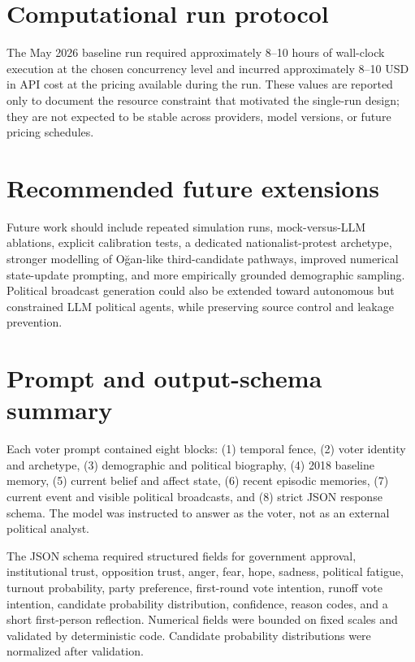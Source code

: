 \documentclass[pdflatex,sn-mathphys-num,iicol]{sn-jnl}
\begin{document}
\begin{appendices}
\section{Computational run protocol}\label{app:protocol}

The May 2026 baseline run required approximately 8--10 hours of wall-clock
execution at the chosen concurrency level and incurred approximately 8--10 USD
in API cost at the pricing available during the run. These values are reported
only to document the resource constraint that motivated the single-run design;
they are not expected to be stable across providers, model versions, or future
pricing schedules.

\section{Recommended future extensions}\label{app:extensions}

Future work should include repeated simulation runs, mock-versus-LLM ablations,
explicit calibration tests, a dedicated nationalist-protest archetype, stronger
modelling of Oğan-like third-candidate pathways, improved numerical state-update
prompting, and more empirically grounded demographic sampling. Political
broadcast generation could also be extended toward autonomous but constrained
LLM political agents, while preserving source control and leakage prevention.

\section{Prompt and output-schema summary}\label{app:prompt}

Each voter prompt contained eight blocks: (1) temporal fence, (2) voter
identity and archetype, (3) demographic and political biography, (4) 2018
baseline memory, (5) current belief and affect state, (6) recent episodic
memories, (7) current event and visible political broadcasts, and (8) strict
JSON response schema. The model was instructed to answer as the voter, not as
an external political analyst.

The JSON schema required structured fields for government approval, institutional
trust, opposition trust, anger, fear, hope, sadness, political fatigue, turnout
probability, party preference, first-round vote intention, runoff vote intention,
candidate probability distribution, confidence, reason codes, and a short
first-person reflection. Numerical fields were bounded on fixed scales and
validated by deterministic code. Candidate probability distributions were
normalized after validation.


\end{appendices}
\end{document}

